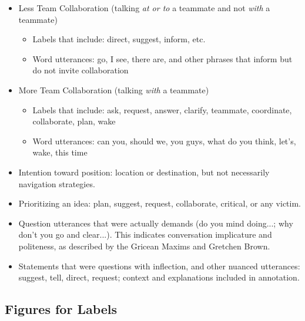 \begin{itemize}
    \item Less Team Collaboration (talking \emph{at or to} a teammate and not \emph{with} a teammate)
    \begin{itemize}
    	\item Labels that include: direct, suggest, inform, etc.
	\item Word utterances: go, I see, there are, and other phrases that inform but do not invite collaboration
    \end{itemize}
    \item More Team Collaboration (talking \emph{with} a teammate)
    \begin{itemize}
        \item Labels that include: ask, request, answer, clarify, teammate, coordinate, collaborate, plan, wake
        \item Word utterances: can you, should we, you guys, what do you think, let's, wake, this time
    \end{itemize}
    \item Intention toward position: location or destination, but not necessarily navigation strategies.
    \item Prioritizing an idea: plan, suggest, request, collaborate, critical, or any victim.
    \item Question utterances that were actually demands (do you mind doing...; why don't you go and clear...). This indicates conversation implicature and politeness, as described by the Gricean Maxims and Gretchen Brown.
    \item Statements that were questions with inflection, and other nuanced utterances: suggest, tell, direct, request; context and explanations included in annotation.
\end{itemize}










\newpage
\subsection{Figures for Labels}
